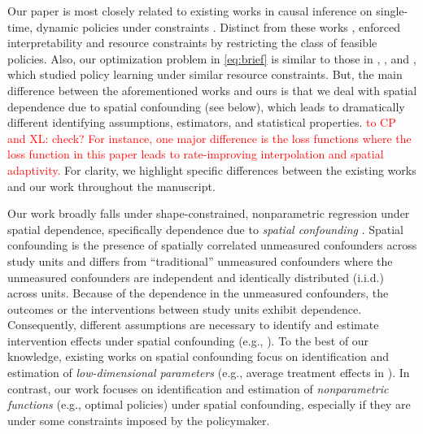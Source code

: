\documentclass[12pt]{article}
\newcommand{\CP}[1]{{\color{purple}From Chan: #1}}
\newcommand{\XL}[1]{{\color{blue}from Xindi: #1}}
\begin{document}
Our paper is most closely related to existing works in causal inference on  single-time, dynamic policies under constraints 
\citep{Laber2018, Ren2022,jia2025bayesian,gu2025safe, wu2021offline,qiu2022individualized,viviano2020experimental, ma2021causal,sun2024empirical}. Distinct from these works , \citet{KitagawaTetenov2018, athey2021policy,Kitagawa2021} enforced interpretability and resource constraints by restricting the class of feasible policies. 
Also, our optimization problem in \eqref{eq:brief} is similar to those in \citet{chen2022policy}, \citet{park2023personalized}, and \citet{park2024minimum}, which studied policy learning under similar resource constraints. But, the main difference between the aforementioned works and ours is that we deal with spatial dependence due to spatial confounding (see below), which leads to dramatically different identifying assumptions, estimators, and statistical properties. \textcolor{red}{to CP and XL: check? For instance, one major difference is the loss functions where the loss function in this paper leads to rate-improving interpolation and spatial adaptivity.} For clarity, we highlight specific differences between the existing works and our work throughout the manuscript.

Our work broadly falls under shape-constrained,  nonparametric regression under spatial dependence, specifically dependence due to \emph{spatial confounding} \citep{paciorek2010importance,hodges2010adding,zigler2021spatial,reich2021review}. Spatial confounding is the presence of spatially correlated unmeasured confounders across study units and differs from ``traditional'' unmeasured confounders where the unmeasured confounders are independent and identically distributed (i.i.d.) across units. Because of the dependence in the unmeasured confounders, the outcomes or the interventions between study units exhibit dependence. Consequently, different assumptions are necessary to  identify and estimate intervention effects under spatial confounding (e.g., \citet{thaden2018structural,papadogeorgou2019adjusting,khan2022restricted,gilbert2021causal,dupont2022spatial+,wiecha2024two,gilbert2024consistency,datta2025consistent,burman2025robust}). To the best of our knowledge, existing works on spatial confounding focus on identification and estimation of \emph{low-dimensional parameters} (e.g., average treatment effects in \citet{gilbert2024consistency}). In contrast, our work focuses on identification and estimation of \emph{nonparametric functions} (e.g., optimal policies) under spatial confounding, especially if they are under some constraints imposed by the policymaker. %
\end{document}
